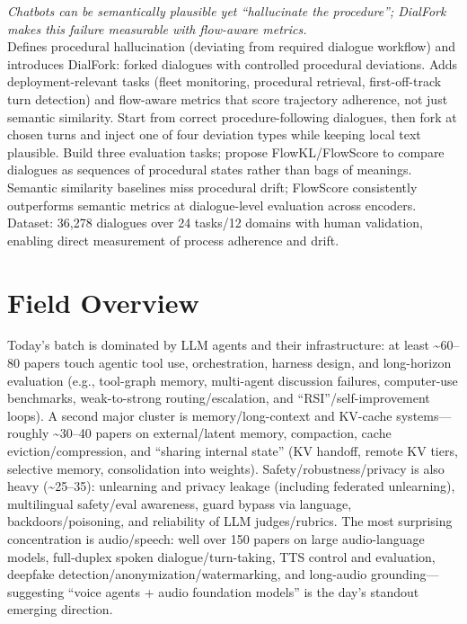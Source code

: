 \documentclass[12pt,letterpaper]{article}
\begin{document}
{\small\textit{Chatbots can be semantically plausible yet ``hallucinate the procedure''; DialFork makes this failure measurable with flow-aware metrics.}}\\[1pt]
{\footnotesize Defines procedural hallucination (deviating from required dialogue workflow) and introduces DialFork: forked dialogues with controlled procedural deviations. Adds deployment-relevant tasks (fleet monitoring, procedural retrieval, first-off-track turn detection) and flow-aware metrics that score trajectory adherence, not just semantic similarity. Start from correct procedure-following dialogues, then fork at chosen turns and inject one of four deviation types while keeping local text plausible. Build three evaluation tasks; propose FlowKL/FlowScore to compare dialogues as sequences of procedural states rather than bags of meanings. Semantic similarity baselines miss procedural drift; FlowScore consistently outperforms semantic metrics at dialogue-level evaluation across encoders. Dataset: 36,278 dialogues over 24 tasks/12 domains with human validation, enabling direct measurement of process adherence and drift.}

\medskip



\section*{Field Overview}
{\footnotesize Today's batch is dominated by LLM agents and their infrastructure: at least \textasciitilde{}60--80 papers touch agentic tool use, orchestration, harness design, and long-horizon evaluation (e.g., tool-graph memory, multi-agent discussion failures, computer-use benchmarks, weak-to-strong routing/escalation, and ``RSI''/self-improvement loops). A second major cluster is memory/long-context and KV-cache systems---roughly \textasciitilde{}30--40 papers on external/latent memory, compaction, cache eviction/compression, and ``sharing internal state'' (KV handoff, remote KV tiers, selective memory, consolidation into weights). Safety/robustness/privacy is also heavy (\textasciitilde{}25--35): unlearning and privacy leakage (including federated unlearning), multilingual safety/eval awareness, guard bypass via language, backdoors/poisoning, and reliability of LLM judges/rubrics. The most surprising concentration is audio/speech: well over 150 papers on large audio-language models, full‑duplex spoken dialogue/turn-taking, TTS control and evaluation, deepfake detection/anonymization/watermarking, and long-audio grounding---suggesting ``voice agents + audio foundation models'' is the day's standout emerging direction.}
\end{document}
